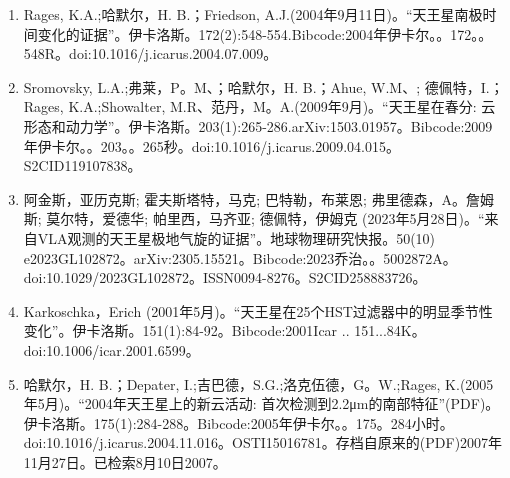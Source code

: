 \begin{enumerate}
\item Rages, K.A.;哈默尔，H. B.；Friedson, A.J.(2004年9月11日)。“天王星南极时间变化的证据”。伊卡洛斯。172(2):548-554.Bibcode:2004年伊卡尔。。172。。548R。doi:10.1016/j.icarus.2004.07.009。
\item Sromovsky, L.A.;弗莱，P。M、；哈默尔，H. B.；Ahue, W.M、; 德佩特，I.；Rages, K.A.;Showalter, M.R、范丹，M。A.(2009年9月)。“天王星在春分: 云形态和动力学”。伊卡洛斯。203(1):265-286.arXiv:1503.01957。Bibcode:2009年伊卡尔。。203。。265秒。doi:10.1016/j.icarus.2009.04.015。S2CID119107838。  
\item 阿金斯，亚历克斯; 霍夫斯塔特，马克; 巴特勒，布莱恩; 弗里德森，A。詹姆斯; 莫尔特，爱德华; 帕里西，马齐亚; 德佩特，伊姆克 (2023年5月28日)。“来自VLA观测的天王星极地气旋的证据”。地球物理研究快报。50(10) e2023GL102872。arXiv:2305.15521。Bibcode:2023乔治。。5002872A。doi:10.1029/2023GL102872。ISSN0094-8276。S2CID258883726。  
\item Karkoschka，Erich (2001年5月)。“天王星在25个HST过滤器中的明显季节性变化”。伊卡洛斯。151(1):84-92。Bibcode:2001Icar .. 151...84K。doi:10.1006/icar.2001.6599。
\item 哈默尔，H. B.；Depater, I.;吉巴德，S.G.;洛克伍德，G。W.;Rages, K.(2005年5月)。“2004年天王星上的新云活动: 首次检测到2.2μm的南部特征”(PDF)。伊卡洛斯。175(1):284-288。Bibcode:2005年伊卡尔。。175。284小时。doi:10.1016/j.icarus.2004.11.016。OSTI15016781。存档自原来的(PDF)2007年11月27日。已检索8月10日2007。  

\end{enumerate}









